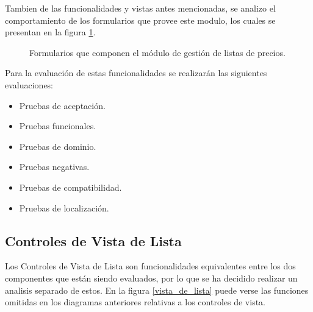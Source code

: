 Tambien de las funcionalidades y vistas antes mencionadas, se analizo el
comportamiento de los formularios que provee este modulo, los cuales se
presentan en la figura \ref{listas_de_precios_formularios}.

\begin{figure}
\centering
{}
\caption{Formularios que componen el módulo de gestión de listas de precios.}
\label{listas_de_precios_formularios}
\end{figure}

Para la evaluación de estas funcionalidades se realizarán las siguientes
evaluaciones:

\begin{itemize}
\item Pruebas de aceptación.
\item Pruebas funcionales.
\item Pruebas de dominio.
\item Pruebas negativas.
\item Pruebas de compatibilidad.
\item Pruebas de localización.
\end{itemize}

\subsection{Controles de Vista de Lista}
Los Controles de Vista de Lista son funcionalidades equivalentes entre los 
dos componentes que están siendo evaluados, por lo que se ha decidido realizar
un analisis separado de estos. En la figura \ref{vista_de_lista} puede verse
las funciones omitidas en los diagramas anteriores relativas a los controles de
vista.

